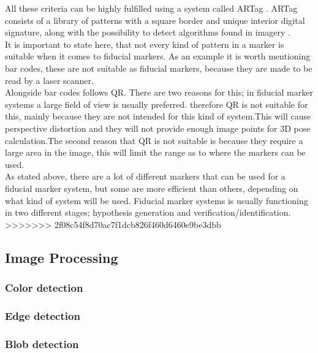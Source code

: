 				All these criteria can be highly fulfilled using a system called ARTag \cite{fiducialARTag}. ARTag consists of a library of patterns with a square border and unique interior digital signature, along with the possibility to detect algorithms found in imagery \cite{fiducialMarkers}.\\
				
				It is important to state here, that not every kind of pattern in a marker is suitable when it comes to fiducial markers\cite{fiducialMarkers}. As an example it is worth mentioning bar codes, these are not suitable as fiducial markers, because they are made to be read by a laser scanner.\\
				Alongside bar codes follows QR. There are two reasons for this; in fiducial marker systems a large field of view is usually preferred. therefore QR is not suitable for this, mainly because they are not intended for this kind of system.This will cause perspective distortion and they will not provide enough image points for 3D pose calculation.The second reason that QR is not suitable is because they require a large area in the image, this will limit the range as to where the markers can be used.\\ 
				
				
				As stated above, there are a lot of different markers that can be used for a fiducial marker system, but some are more efficient than others, depending on what kind of system will be used.
				Fiducial marker systems is usually functioning in two different stages; hypothesis generation and verification/identification.\\
				
				
				
				
>>>>>>> 2f08c54f8d70ac7f1dcb826f460d6460e9be3dbb

		\subsection{Image Processing}
			\subsubsection{Color detection}
			
			\subsubsection{Edge detection}
			
			\subsubsection{Blob detection}
			
